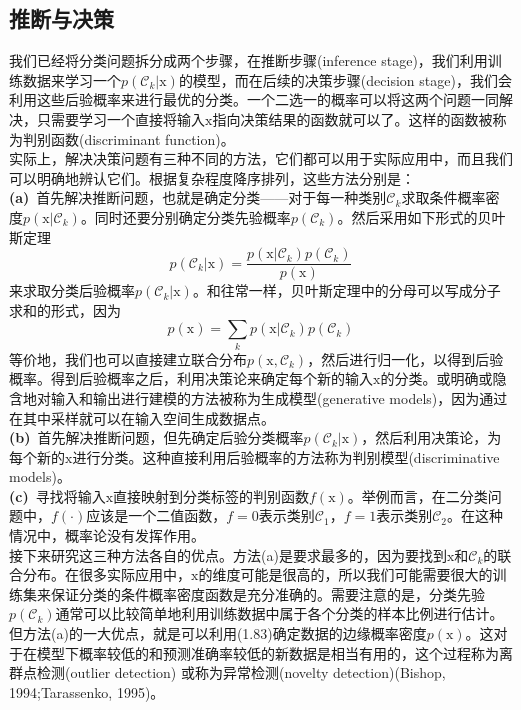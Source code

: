 \documentclass[b5paper]{book}
\numberwithin{equation}{chapter}
\begin{document}
	\subsection{推断与决策}
	\textnormal{我们已经将分类问题拆分成两个步骤，在推断步骤(inference stage)，我们利用训练数据来学习一个$p(\mathcal{C}_k|\boldsymbol{\mathrm{x}})$的模型，而在后续的决策步骤(decision stage)，我们会利用这些后验概率来进行最优的分类。一个二选一的概率可以将这两个问题一同解决，只需要学习一个直接将输入$\boldsymbol{\mathrm{x}}$指向决策结果的函数就可以了。这样的函数被称为判别函数(discriminant function)。\\
	\indent 实际上，解决决策问题有三种不同的方法，它们都可以用于实际应用中，而且我们可以明确地辨认它们。根据复杂程度降序排列，这些方法分别是：\\
	\textbf{(a)}\ 首先解决推断问题，也就是确定分类——对于每一种类别$\mathcal{C}_k$求取条件概率密度$p(\boldsymbol{\mathrm{x}}|\mathcal{C}_k)$。同时还要分别确定分类先验概率$p(\mathcal{C}_k)$。然后采用如下形式的贝叶斯定理
	\begin{equation}
		p(\mathcal{C}_k|\boldsymbol{\mathrm{x}})=\frac{p(\boldsymbol{\mathrm{x}}|\mathcal{C}_k)p(\mathcal{C}_k)}{p(\boldsymbol{\mathrm{x}})}
	\end{equation}
	来求取分类后验概率$p(\mathcal{C}_k|\boldsymbol{\mathrm{x}})$。和往常一样，贝叶斯定理中的分母可以写成分子求和的形式，因为
	\begin{equation}
		p(\boldsymbol{\mathrm{x}})=\sum_k p(\boldsymbol{\mathrm{x}}|\mathcal{C}_k)p(\mathcal{C}_k)
	\end{equation}
	等价地，我们也可以直接建立联合分布$p(\boldsymbol{\mathrm{x}},\mathcal{C}_k)$，然后进行归一化，以得到后验概率。得到后验概率之后，利用决策论来确定每个新的输入$\boldsymbol{\mathrm{x}}$的分类。或明确或隐含地对输入和输出进行建模的方法被称为生成模型(generative models)，因为通过在其中采样就可以在输入空间生成数据点。\\
	\textbf{(b)}\ 首先解决推断问题，但先确定后验分类概率$p(\mathcal{C}_k|\boldsymbol{\mathrm{x}})$，然后利用决策论，为每个新的$\boldsymbol{\mathrm{x}}$进行分类。这种直接利用后验概率的方法称为判别模型(discriminative models)。\\
	\textbf{(c)}\ 寻找将输入$\boldsymbol{\mathrm{x}}$直接映射到分类标签的判别函数$f(\boldsymbol{\mathrm{x}})$。举例而言，在二分类问题中，$f(\cdot)$应该是一个二值函数，$f=0$表示类别$\mathcal{C}_1$，$f=1$表示类别$\mathcal{C}_2$。在这种情况中，概率论没有发挥作用。\\
	\indent 接下来研究这三种方法各自的优点。方法(a)是要求最多的，因为要找到$\boldsymbol{\mathrm{x}}$和$\mathcal{C}_k$的联合分布。在很多实际应用中，$\boldsymbol{\mathrm{x}}$的维度可能是很高的，所以我们可能需要很大的训练集来保证分类的条件概率密度函数是充分准确的。需要注意的是，分类先验$p(\mathcal{C}_k)$通常可以比较简单地利用训练数据中属于各个分类的样本比例进行估计。但方法(a)的一大优点，就是可以利用(1.83)确定数据的边缘概率密度$p(\boldsymbol{\mathrm{x}})$。这对于在模型下概率较低的和预测准确率较低的新数据是相当有用的，这个过程称为离群点检测(outlier detection) 或称为异常检测(novelty detection)(Bishop, 1994;Tarassenko, 1995)。\\
}
\end{document}
